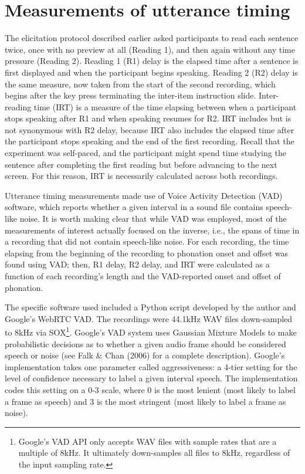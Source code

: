 \documentclass[11pt,oneside]{book}
\let\rmarkdownfootnote\footnote%
\def\footnote{\protect\rmarkdownfootnote}
\begin{document}
\hypertarget{method-irt}{%
\section{Measurements of utterance timing}\label{method-irt}}

The elicitation protocol described earlier asked participants to read each sentence twice, once with no preview at all (Reading 1), and then again without any time pressure (Reading 2). Reading 1 (R1) delay is the elapsed time after a sentence is first displayed and when the participant begins speaking. Reading 2 (R2) delay is the same measure, now taken from the start of the second recording, which begins after the key press terminating the inter-item instruction slide. Inter-reading time (IRT) is a measure of the time elapsing between when a participant stops speaking after R1 and when speaking resumes for R2. IRT includes but is not synonymous with R2 delay, because IRT also includes the elapsed time after the participant stops speaking and the end of the first recording. Recall that the experiment was self-paced, and the participant might spend time studying the sentence after completing the first reading but before advancing to the next screen. For this reason, IRT is necessarily calculated across both recordings.

Utterance timing measurements made use of Voice Activity Detection (VAD) software, which reports whether a given interval in a sound file contains speech-like noise. It is worth making clear that while VAD was employed, most of the measurements of interest actually focused on the inverse, i.e., the spans of time in a recording that did not contain speech-like noise. For each recording, the time elapsing from the beginning of the recording to phonation onset and offset was found using VAD; then, R1 delay, R2 delay, and IRT were calculated as a function of each recording's length and the VAD-reported onset and offset of phonation.

The specific software used included a Python script developed by the author and Google's WebRTC VAD. The recordings were 44.1kHz WAV files down-sampled to 8kHz via SOX\footnote{Google's VAD API only accepts WAV files with sample rates that are a multiple of 8kHz. It ultimately down-samples all files to 8kHz, regardless of the input sampling rate.}. Google's VAD system uses Gaussian Mixture Models to make probabilistic decisions as to whether a given audio frame should be considered speech or noise (see Falk \& Chan (2006) for a complete description). Google's implementation takes one parameter called aggressiveness: a 4-tier setting for the level of confidence necessary to label a given interval speech. The implementation codes this setting on a 0-3 scale, where 0 is the most lenient (most likely to label a frame as speech) and 3 is the most stringent (most likely to label a frame as noise).
\end{document}
